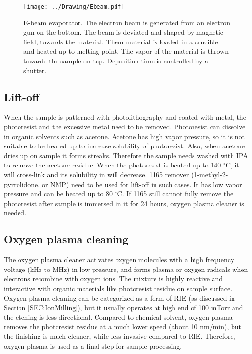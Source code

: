 \documentclass[pdftex, sectionletters]{pittetd}    %
\begin{document}
\begin{figure}[p]
	\centering
	\texttt{[image: ../Drawing/Ebeam.pdf]}
	\caption{E-beam evaporator. The electron beam is generated from an electron gun on the bottom. The beam is deviated and shaped by magnetic field, towards the material. Them material is loaded in a crucible and heated up to melting point. The vapor of the material is thrown towards the sample on top. Deposition time is controlled by a shutter.}
	\label{FIG:Ebeam}
\end{figure}

\subsection{Lift-off}

When the sample is patterned with photolithography and coated with metal, the photoresist and the excessive metal need to be removed. Photoresist can dissolve in organic solvents such as acetone. Acetone has high vapor pressure, so it is not suitable to be heated up to increase solubility of photoresist. Also, when acetone dries up on sample it forms streaks. Therefore the sample needs washed with IPA to remove the acetone residue. When the photoresist is heated up to 140 $^{\circ}$C, it will cross-link and its solubility in will decrease. 1165 remover (1-methyl-2-pyrrolidone, or NMP) need to be used for lift-off in such cases. It has low vapor pressure and can be heated up to 80 $^{\circ}$C. If 1165 still cannot fully remove the photoresist after sample is immersed in it for 24 hours, oxygen plasma cleaner is needed.

\subsection{Oxygen plasma cleaning}

The oxygen plasma cleaner activates oxygen molecules with a high frequency voltage (kHz to MHz) in low pressure, and forms plasma or oxygen radicals when electrons recombine with oxygen ions. The mixture is highly reactive and interactive with organic materials like photoresist residue on sample surface. Oxygen plasma cleaning can be categorized as a form of RIE (as discussed in Section \ref{SEC:IonMilling}), but it usually operates at high end of 100 mTorr and the etching is less directional. Compared to chemical solvent, oxygen plasma removes the photoresist residue at a much lower speed (about 10 nm/min), but the finishing is much cleaner, while less invasive compared to RIE. Therefore, oxygen plasma is used as a final step for sample processing.
\end{document}
